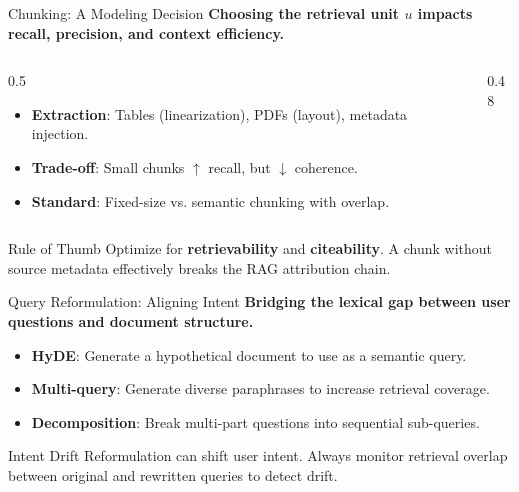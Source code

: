 \documentclass[aspectratio=169, xcolor=table]{beamer}
\newif\ifanimated
\newcommand{\cpause}{\ifanimated\pause\fi}
\begin{document}
\begin{frame}{Chunking: A Modeling Decision}
\textbf{Choosing the retrieval unit $u$ impacts recall, precision, and context efficiency.}

\vspace{0.8em}
\begin{columns}[T]
\begin{column}{0.5\textwidth}
\begin{itemize}
    \item \textbf{Extraction}: Tables (linearization), PDFs (layout), metadata injection.
    \item \textbf{Trade-off}: Small chunks $\uparrow$ recall, but $\downarrow$ coherence.
    \item \textbf{Standard}: Fixed-size vs. semantic chunking with overlap.
\end{itemize}
\end{column}
\begin{column}{0.48\textwidth}
\begin{center}
\resizebox{\textwidth}{!}{

}
\end{center}
\end{column}
\end{columns}

\cpause
\vspace{0.5em}
\begin{block}{Rule of Thumb}
Optimize for \textbf{retrievability} and \textbf{citeability}. A chunk without source metadata effectively breaks the RAG attribution chain.
\end{block}
\end{frame}

\begin{frame}{Query Reformulation: Aligning Intent}
\textbf{Bridging the lexical gap between user questions and document structure.}

\vspace{0.8em}
\begin{itemize}
    \item \textbf{HyDE}: Generate a hypothetical document to use as a semantic query.
    \item \textbf{Multi-query}: Generate diverse paraphrases to increase retrieval coverage.
    \item \textbf{Decomposition}: Break multi-part questions into sequential sub-queries.
\end{itemize}

\vspace{1em}
\cpause
\begin{alertblock}{Intent Drift}
Reformulation can shift user intent. Always monitor retrieval overlap between original and rewritten queries to detect drift.
\end{alertblock}
\end{frame}
\end{document}
